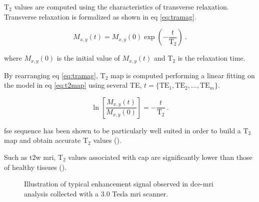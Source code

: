 \begin{enumerate}[leftmargin=*]
T$_2$ values are computed using the characteristics of transverse relaxation. Transverse relaxation is formalized as shown in \acs{eq} \ref{eq:tramag}.

\begin{equation}
	M_{x,y}(t) = M_{x,y}(0) \exp \left( - \frac{t}{\text{T}_2} \right) \ .
	\label{eq:tramag}
\end{equation}

\noindent where $M_{x,y}(0)$ is the initial value of $M_{x,y}(t)$ and T$_2$ is the relaxation time.

By rearranging \acs{eq} \ref{eq:tramag}, T$_2$ map is computed performing a linear fitting on the model in \acs{eq} \ref{eq:t2map} using several TE, $t=\{ \text{TE}_1,\text{TE}_2, \dotsc ,\text{TE}_m \}$.

\begin{equation}
	\ln \left[ \frac{M_{x,y}(t)}{M_{x,y}(0)} \right] = - \frac{t}{\text{T}_2} \ .
	\label{eq:t2map}
\end{equation}

\Ac{fse} sequence has been shown to be particularly well suited in order to build a T$_2$ map and obtain accurate T$_2$ values (\cite{Liney1996a}).

Such as \ac{t2w} \ac{mri}, T$_2$ values associated with \ac{cap} are significantly lower than those of healthy tissues (\cite{Liney1996,Gibbs2001}).

\begin{figure}
\centering
	\hspace*{\fill}
	 \hfill
	\hspace*{\fill}
	\caption{Illustration of typical enhancement signal observed in \ac{dce}-\ac{mri} analysis collected with a 3.0 Tesla \ac{mri} scanner.}
	\label{fig:dceana}
\end{figure}


\end{enumerate}
